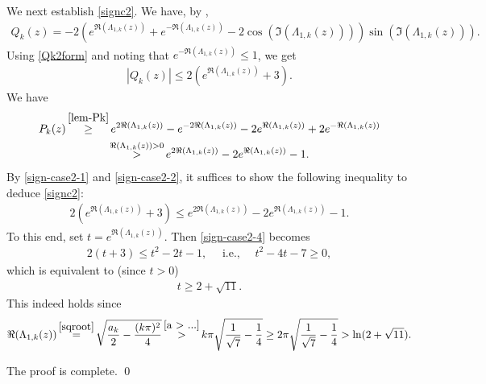 \documentclass[11pt, reqno]{amsart}
\theoremstyle{plain}
\numberwithin{equation}{section}
\begin{document}
\medskip    
    
We next establish \eqref{signc2}.  We have, by , 
\begin{align} 
 Q_k(z)  = - 2 \left(e^{\Re (\Lambda_{1,k}(z))} + e^{-\Re (\Lambda_{1,k}(z))} - 2 \cos (\Im (\Lambda_{1,k}(z)) ) \right)  \sin (\Im (\Lambda_{1,k}(z))).	\label{Qk2form}
\end{align}
Using \eqref{Qk2form} and noting that $e^{-\Re(\Lambda_{1,k}(z))} \leq 1$, we get
    \begin{align}	\label{sign-case2-1}
         |Q_k(z)|   \leq 2 \left(e^{\Re (\Lambda_{1,k}(z))} + 3 \right).
    \end{align}
   We have 
    \begin{multline}
       P_k(z) \mathop{\geq}^{\Cref{lem-Pk}} e^{2\Re (\Lambda_{1,k}(z))}  - e^{-2\Re (\Lambda_{1,k}(z))} - 2 e^{ \Re (\Lambda_{1,k}(z))}  + 2 e^{-\Re (\Lambda_{1,k}(z))} \\
          \mathop{>}^{\Re (\Lambda_{1, k}(z)) > 0} e^{2\Re (\Lambda_{1,k}(z))} - 2 e^{ \Re (\Lambda_{1,k}(z))} - 1.		\label{sign-case2-2}
    \end{multline}
    By \eqref{sign-case2-1} and \eqref{sign-case2-2}, it suffices to show the following inequality to deduce \eqref{signc2}:
  \begin{align}\label{sign-case2-4}		
        2 \left(e^{\Re (\Lambda_{1,k}(z))} + 3 \right) \leq e^{2\Re (\Lambda_{1,k}(z))} - 2 e^{\Re (\Lambda_{1,k}(z))} - 1. %
    \end{align}    
  To this end, set $t = e^{\Re(\Lambda_{1,k}(z))}$. Then \eqref{sign-case2-4} becomes
\begin{align*}
	2(t + 3) \leq t^2 - 2t - 1, \quad \text{ i.e., } \quad  t^2 - 4t - 7 \geq 0,
\end{align*}    
which is equivalent to (since $t > 0$)
\begin{align}	\label{sign-case2-3}
t \geq 2 + \sqrt{11}.
\end{align}
This indeed holds since 
\begin{align*}
       \Re (\Lambda_{1,k}(z)) \mathop{=}^{\eqref{sqroot}} \sqrt{\frac{a_k}{2} -\frac{(k \pi)^2}{4}  } \mathop{>}^{\eqref{a > ...}} k \pi \sqrt{\frac{1}{\sqrt{7}} - \frac{1}{4}} \geq 2 \pi \sqrt{\frac{1}{\sqrt{7}} - \frac{1}{4}} > \ln (2 + \sqrt{11}). 
    \end{align*}
    
    The proof is complete.  \qed
  
\end{document}
